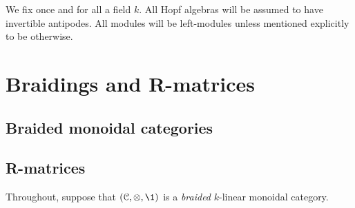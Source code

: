 \begin{convention}
    We fix once and for all a field $k$. All Hopf algebras will be assumed to have invertible antipodes. All modules will be left-modules unless mentioned explicitly to be otherwise.
\end{convention}

\section{Braidings and R-matrices}
    \subsection{Braided monoidal categories}

    \subsection{R-matrices}
        \begin{convention}
            Throughout, suppose that $(\C, \tensor, \1)$ is a \textit{braided} $k$-linear monoidal category.
        \end{convention}
    
